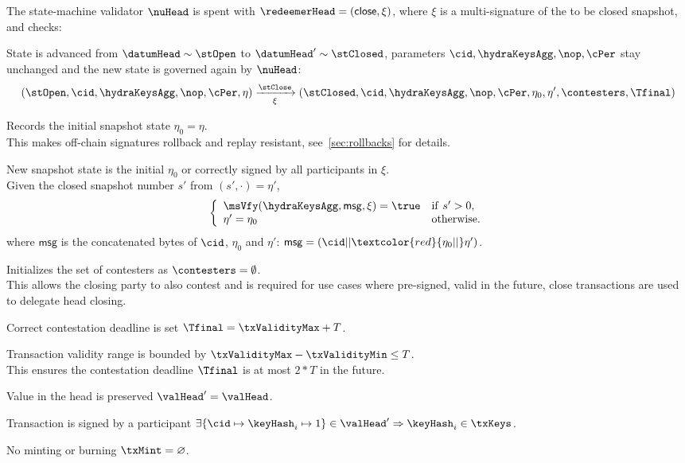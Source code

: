 \begin{samepage}
	\noindent The state-machine validator $\nuHead$ is spent with
	$\redeemerHead = (\mathsf{close}, \xi)$, where $\xi$ is a multi-signature of
	the to be closed snapshot, and checks:
	\begin{menumerate}
		\item State is advanced from $\datumHead \sim \stOpen$ to
		$\datumHead' \sim \stClosed$, parameters $\cid,\hydraKeysAgg,\nop,\cPer$
		stay unchanged and the new state is governed again by $\nuHead$:
		\[
			(\stOpen,\cid,\hydraKeysAgg,\nop,\cPer,\eta) \xrightarrow[\xi]{\stClose} (\stClosed,\cid,\hydraKeysAgg,\nop,\cPer,\eta_0,\eta',\contesters,\Tfinal)
		\]
		\item Records the initial snapshot state $\eta_0 = \eta$. \\
		This makes off-chain signatures rollback and replay resistant,
		see~\ref{sec:rollbacks} for details.
		\item New snapshot state is the initial $\eta_{0}$
		or correctly signed by all participants in $\xi$. \\
		Given the closed snapshot number $s'$ from $(s', \cdot) = \eta'$,
		\[
			\left\{\begin{array}{ll}
				\msVfy(\hydraKeysAgg,\mathsf{msg},\xi) = \true & \mathrm{if} ~ s' > 0, \\
				\eta' = \eta_{0}                               & \mathrm{otherwise.}
			\end{array}\right.
		\]
		where $\mathsf{msg}$ is the concatenated bytes of $\cid$, $\eta_{0}$
		and $\eta'$: $\mathsf{msg} = (\cid || \textcolor{red}{\eta_{0} ||} \eta')$.
		\item Initializes the set of contesters as $\contesters = \emptyset$. \\
		This allows the closing party to also contest and is required for use
		cases where pre-signed, valid in the future, close transactions are
		used to delegate head closing.

		\item Correct contestation deadline is set $\Tfinal = \txValidityMax + T$.
		\item Transaction validity range is bounded by
		$\txValidityMax - \txValidityMin \leq T$. \\
		This ensures the contestation deadline $\Tfinal$ is at most $2*T$ in the future.
		\item Value in the head is preserved $\valHead' = \valHead$.
		\item Transaction is signed by a participant $\exists \{\cid \mapsto \keyHash_{i} \mapsto 1\} \in \valHead' \Rightarrow \keyHash_{i} \in \txKeys$.
		\item No minting or burning $\txMint = \varnothing$.
	\end{menumerate}
\end{samepage}

